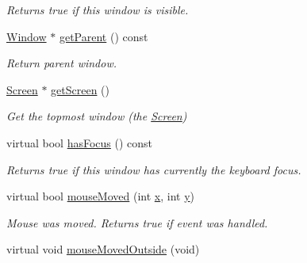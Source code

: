 \begin{DoxyCompactItemize}
\begin{DoxyCompactList}\small\item\em Returns {\ttfamily true} if this window is visible. \end{DoxyCompactList}\item 
\hyperlink{classGUI_1_1Window}{Window} $\ast$ \hyperlink{classGUI_1_1Window_a6b22ed4bc9325ba95e406f2dd3a152a2}{get\-Parent} () const 
\begin{DoxyCompactList}\small\item\em Return parent window. \end{DoxyCompactList}\item 
\hypertarget{classGUI_1_1Window_ae44c4f740234c5b69a7edf1824101957}{\hyperlink{classGUI_1_1Screen}{Screen} $\ast$ \hyperlink{classGUI_1_1Window_ae44c4f740234c5b69a7edf1824101957}{get\-Screen} ()}\label{classGUI_1_1Window_ae44c4f740234c5b69a7edf1824101957}

\begin{DoxyCompactList}\small\item\em Get the topmost window (the \hyperlink{classGUI_1_1Screen}{Screen}) \end{DoxyCompactList}\item 
\hypertarget{classGUI_1_1Window_a8f18763df9af7f1f4b7ce119a966866d}{virtual bool \hyperlink{classGUI_1_1Window_a8f18763df9af7f1f4b7ce119a966866d}{has\-Focus} () const }\label{classGUI_1_1Window_a8f18763df9af7f1f4b7ce119a966866d}

\begin{DoxyCompactList}\small\item\em Returns {\ttfamily true} if this window has currently the keyboard focus. \end{DoxyCompactList}\item 
\hypertarget{classGUI_1_1Window_a7ac4ce83561f33c1f0f91798068bab6c}{virtual bool \hyperlink{classGUI_1_1Window_a7ac4ce83561f33c1f0f91798068bab6c}{mouse\-Moved} (int \hyperlink{classGUI_1_1Window_a6ca6a80ca00c9e1d8ceea8d3d99a657d}{x}, int \hyperlink{classGUI_1_1Window_a0ee8e923aff2c3661fc2e17656d37adf}{y})}\label{classGUI_1_1Window_a7ac4ce83561f33c1f0f91798068bab6c}

\begin{DoxyCompactList}\small\item\em Mouse was moved. Returns true if event was handled. \end{DoxyCompactList}\item 
\hypertarget{classGUI_1_1Window_a27219144cd775914db872cdd40d1cf97}{virtual void \hyperlink{classGUI_1_1Window_a27219144cd775914db872cdd40d1cf97}{mouse\-Moved\-Outside} (void)}\label{classGUI_1_1Window_a27219144cd775914db872cdd40d1cf97}


\end{DoxyCompactItemize}
